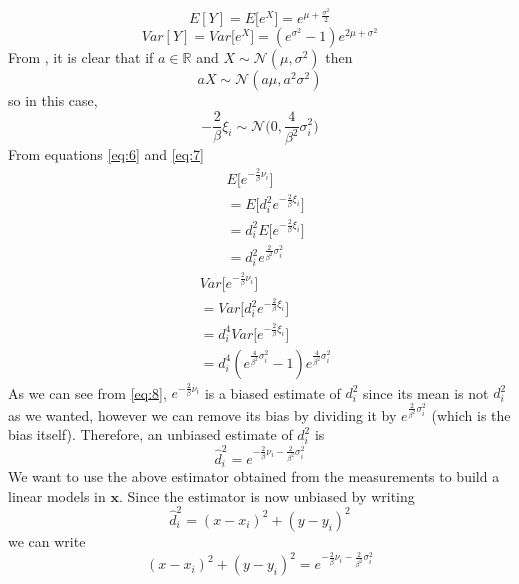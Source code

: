\documentclass[12pt,twoside]{report}
\begin{document}
\begin{equation}
    E[Y]=E\big[e^X\big]=e^{\mu+\frac{\sigma^2}{2}}
    \label{eq:6}
\end{equation}
\begin{equation}
    Var[Y]=Var\big[e^X\big]=(e^{\sigma^2}-1)e^{2\mu+\sigma^2}
    \label{eq:7}
\end{equation}
From \cite{alma9926534668905776}, it is clear that if $a\in \mathbb{R}$ and $X\sim \mathcal{N}(\mu,\sigma^2)$ then
\begin{equation}
aX\sim \mathcal{N}(a\mu,a^2\sigma^2)    
\end{equation}
so in this case, 
\begin{equation}
    -\frac{2}{\beta}\xi_i\sim \mathcal{N}\bigg(0,\frac{4}{\beta^2}\sigma^2_i\bigg)
\end{equation}
From equations \ref{eq:6} and \ref{eq:7}
\begin{align}
    &E\bigg[e^{-\frac{2}{\beta}\nu_i}\bigg]\\
    &=E\bigg[d_i^2e^{-\frac{2}{\beta}\xi_i}\bigg]\\
    &=d_i^2E\bigg[e^{-\frac{2}{\beta}\xi_i}\bigg]\\ &=d_i^2e^{\frac{2}{\beta^2}\sigma^2_i}
    \label{eq:8}
\end{align}
\begin{align}
    &Var\bigg[e^{-\frac{2}{\beta}\nu_i}\bigg]\\
    &=Var\bigg[d_i^2e^{-\frac{2}{\beta}\xi_i}\bigg]\\
    &=d_i^4Var\bigg[e^{-\frac{2}{\beta}\xi_i}\bigg]\\
    &=d_i^4(e^{\frac{4}{\beta^2}\sigma_i^2}-1)e^{\frac{4}{\beta^2}\sigma^2_i}
\end{align}
As we can see from \ref{eq:8}, $e^{-\frac{2}{\beta}\nu_i}$ is a biased estimate of $d_i^2$ since its mean is not $d_i^2$ as we wanted, however we can remove its bias by dividing it by $e^{\frac{2}{\beta^2}\sigma^2_i}$ (which is the bias itself). Therefore, an unbiased estimate of $d_i^2$ is 
\begin{equation}
    \hat{d}_i^2=e^{-\frac{2}{\beta}\nu_i-\frac{2}{\beta^2}\sigma^2_i}
    \label{eq:9}
\end{equation}
We want to use the above estimator obtained from the measurements to build a linear models in $\mathbf{x}$. Since the estimator is now unbiased by writing 
\begin{equation}
    \hat{d}_i^2=(x-x_i)^2+(y-y_i)^2
\end{equation}
we can write
\begin{equation}
    (x-x_i)^2+(y-y_i)^2=e^{-\frac{2}{\beta}\nu_i-\frac{2}{\beta^2}\sigma^2_i}
\end{equation}
\end{document}

